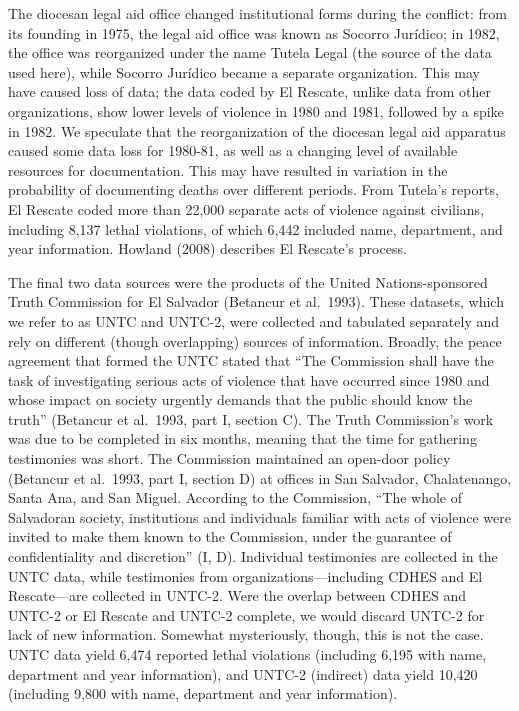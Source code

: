 \documentclass[11pt,]{article}
\begin{document}
The diocesan legal aid office changed institutional forms during the
conflict: from its founding in 1975, the legal aid office was known as
Socorro Jurídico; in 1982, the office was reorganized under the name
Tutela Legal (the source of the data used here), while Socorro Jurídico
became a separate organization. This may have caused loss of data; the
data coded by El Rescate, unlike data from other organizations, show
lower levels of violence in 1980 and 1981, followed by a spike in 1982.
We speculate that the reorganization of the diocesan legal aid apparatus
caused some data loss for 1980-81, as well as a changing level of
available resources for documentation. This may have resulted in
variation in the probability of documenting deaths over different
periods. From Tutela's reports, El Rescate coded more than 22,000
separate acts of violence against civilians, including 8,137 lethal
violations, of which 6,442 included name, department, and year
information. Howland (2008) describes El Rescate's process.

The final two data sources were the products of the United
Nations-sponsored Truth Commission for El Salvador (Betancur et
al.~1993). These datasets, which we refer to as UNTC and UNTC-2, were
collected and tabulated separately and rely on different (though
overlapping) sources of information. Broadly, the peace agreement that
formed the UNTC stated that ``The Commission shall have the task of
investigating serious acts of violence that have occurred since 1980 and
whose impact on society urgently demands that the public should know the
truth'' (Betancur et al.~1993, part I, section C). The Truth
Commission's work was due to be completed in six months, meaning that
the time for gathering testimonies was short. The Commission maintained
an open-door policy (Betancur et al.~1993, part I, section D) at offices
in San Salvador, Chalatenango, Santa Ana, and San Miguel. According to
the Commission, ``The whole of Salvadoran society, institutions and
individuals familiar with acts of violence were invited to make them
known to the Commission, under the guarantee of confidentiality and
discretion'' (I, D). Individual testimonies are collected in the UNTC
data, while testimonies from organizations---including CDHES and El
Rescate---are collected in UNTC-2. Were the overlap between CDHES and
UNTC-2 or El Rescate and UNTC-2 complete, we would discard UNTC-2 for
lack of new information. Somewhat mysteriously, though, this is not the
case. UNTC data yield 6,474 reported lethal violations (including 6,195
with name, department and year information), and UNTC-2 (indirect) data
yield 10,420 (including 9,800 with name, department and year
information).
\end{document}
